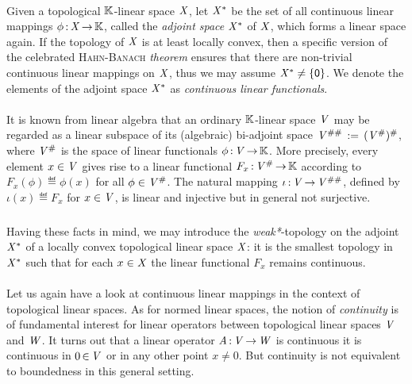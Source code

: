 \documentclass[11pt,twoside]{article}
\begin{document}
\paragraph{} %
Given a topological ${\mathbb{K}}$-linear space $\mathit{X}$,
let $\mathit{X}^*$ be the set of all continuous linear mappings
$\phi{\,:\,}\mathit{X} {\,\to\,} {\mathbb{K}}$,
called the \textit{adjoint space} $\mathit{X}^*$ of $\mathit{X}$,
which forms a linear space again.
If the topology of $\mathit{X}$ is at least locally convex,
then a specific version of the celebrated \textsc{Hahn-Banach} \textit{theorem}
ensures that
there are non-trivial continuous linear mappings on $\mathit{X}$,
thus we may assume $\mathit{X}^* \neq \{{\mathsf{0}}\}$.
We denote the elements of the adjoint space $\mathit{X}^*$ as
\textit{continuous linear functionals}.

\paragraph{} %
It is known from linear algebra
that an ordinary ${\mathbb{K}}$-linear space $\mathit{V}$ may be regarded
as a linear subspace of its (algebraic) bi-adjoint space
$\mathit{V}^{\#\#} \,:=\, (\mathit{V}^{\#})^{\#}$,
where $\mathit{V}^{\#}$ is the space of linear functionals $\phi{\,:\,}\mathit{V} {\,\to\,} {\mathbb{K}}$.
More precisely,
every element $x \in \mathit{V}$ gives rise to a linear functional
$F_x{\,:\,}\mathit{V}^{\#} {\,\to\,} {\mathbb{K}}$ according to
$F_x(\phi) \eqdef \phi(x)$ for all $\phi \in \mathit{V}^{\#}$.
The natural mapping $\iota{\,:\,}\mathit{V} {\,\to\,} \mathit{V}^{\#\#}$,
defined by $\iota(x) \eqdef F_x$ for $x \in \mathit{V}$,
is linear and injective but in general not surjective.

\subparagraph{} %
Having these facts in mind,
we may introduce the \textit{weak*}-topology on the adjoint $\mathit{X}^*$
of a locally convex topological linear space $\mathit{X}$:
it is the smallest topology in $\mathit{X}^*$
such that
for each $x \in \mathit{X}$ the linear functional $F_x$ remains continuous.

\paragraph{} %
Let us again have a look at continuous linear mappings in the context
of topological linear spaces.
As for normed linear spaces,
the notion of \textit{continuity} is of fundamental interest
for linear operators between topological linear spaces $\mathit{V}$ and $\mathit{W}$.
It turns out that a linear operator $\mathit{A} {\,:\,} \mathit{V} {\,\to\,} \mathit{W}$ is continuous
\iff
it is continuous in $0 {\,\in\,} \mathit{V}$ or in any other point $x \neq 0$.
But continuity is not equivalent to boundedness in this general setting.
\end{document}
